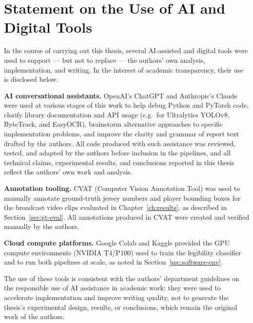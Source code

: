 \chapter*{Statement on the Use of AI and Digital Tools}

In the course of carrying out this thesis, several AI-assisted and
digital tools were used to support --- but not to replace --- the
authors' own analysis, implementation, and writing. In the interest of
academic transparency, their use is disclosed below.

\textbf{AI conversational assistants.} OpenAI's ChatGPT and
Anthropic's Claude were used at various stages of this work to help
debug Python and PyTorch code, clarify library documentation and API
usage (e.g.\ for Ultralytics YOLOv8, ByteTrack, and EasyOCR),
brainstorm alternative approaches to specific implementation problems,
and improve the clarity and grammar of report text drafted by the
authors. All code produced with such assistance was reviewed,
tested, and adapted by the authors before inclusion in the pipelines,
and all technical claims, experimental results, and conclusions
reported in this thesis reflect the authors' own work and analysis.

\textbf{Annotation tooling.} CVAT (Computer Vision Annotation Tool)
was used to manually annotate ground-truth jersey numbers and player
bounding boxes for the broadcast video clips evaluated in
Chapter~\ref{ch:results}, as described in
Section~\ref{sec:gt-eval}. All annotations produced in CVAT were
created and verified manually by the authors.

\textbf{Cloud compute platforms.} Google Colab and Kaggle provided the
GPU compute environments (NVIDIA T4/P100) used to train the legibility
classifier and to run both pipelines at scale, as noted in
Section~\ref{sec:software-env}.

The use of these tools is consistent with the authors' department
guidelines on the responsible use of AI assistance in academic work:
they were used to accelerate implementation and improve writing
quality, not to generate the thesis's experimental design, results,
or conclusions, which remain the original work of the authors.
